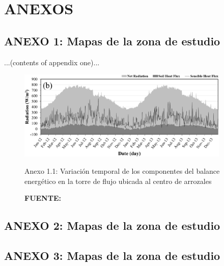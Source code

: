 \appendix
\setcounter{chapter}{7}
\renewcommand{\thechapter}{\Roman{chapter}.}
\setcounter{section}{7}%
\renewcommand{\thesection}{\arabic{chapter}.\arabic{section}}%

\chapter[\hspace{0.35cm}ANEXOS]{ANEXOS}
\thispagestyle{empty}
\section*{ANEXO 1: Mapas de la zona de estudio}
...(contents of appendix one)...

\begin{figure}[htbp!]
    \centering
    \includegraphics[width=0.9\textwidth]{Figures/f2.png}
    \caption*{Anexo 1.1: Variación temporal de los componentes del balance energético en la torre de flujo ubicada al centro de arrozales}
    \captionsetup{labelfont=rm,skip=2pt,textfont=rm,font=small}
        \caption*{\textbf{FUENTE:} \parencite{Lee2016}}
    \label{fig:a1}
\end{figure}

\section*{ANEXO 2: Mapas de la zona de estudio}

\section*{ANEXO 3: Mapas de la zona de estudio}

